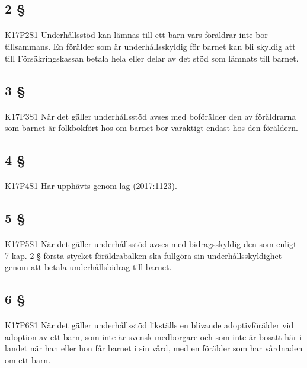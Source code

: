 \documentclass[a4paper,notitlepage,openany,10pt]{book}
\begin{document}
\subsection*{2 §}
\paragraph*{}
{\tiny K17P2S1}
Underhållsstöd kan lämnas till ett barn vars föräldrar inte bor tillsammans. En förälder som är underhållsskyldig för barnet kan bli skyldig att till Försäkringskassan betala hela eller delar av det stöd som lämnats till barnet.
\subsection*{3 §}
\paragraph*{}
{\tiny K17P3S1}
När det gäller underhållsstöd avses med boförälder den av föräldrarna som barnet är folkbokfört hos om barnet bor varaktigt endast hos den föräldern.
\subsection*{4 §}
\paragraph*{}
{\tiny K17P4S1}
Har upphävts genom
lag (2017:1123).
\subsection*{5 §}
\paragraph*{}
{\tiny K17P5S1}
När det gäller underhållsstöd avses med bidragsskyldig den som enligt 7 kap. 2 § första stycket föräldrabalken ska fullgöra sin underhållsskyldighet genom att betala underhållsbidrag till barnet.
\subsection*{6 §}
\paragraph*{}
{\tiny K17P6S1}
När det gäller underhållsstöd likställs en blivande adoptivförälder vid adoption av ett barn, som inte är svensk medborgare och som inte är bosatt här i landet när han eller hon får barnet i sin vård, med en förälder som har vårdnaden om ett barn.
\end{document}
